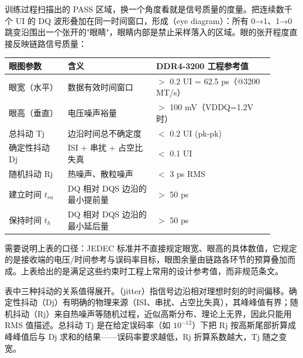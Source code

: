 

训练过程扫描出的 PASS 区域，换一个角度看就是信号质量的度量。把连续数千个 UI 的 DQ 波形叠加在同一时间窗口，形成（eye diagram）：所有 0→1、1→0 跳变沿围出一个张开的"眼睛"，眼睛内部是禁止采样落入的区域。眼的张开程度直接反映链路信号质量：

\begin{longtable}{L{0.2\linewidth}L{0.3\linewidth}L{0.4\linewidth}}
\toprule
眼图参数 & 含义 & DDR4-3200 工程参考值 \\
\midrule
眼宽（水平） & 数据有效时间窗口 & $>$ 0.2 UI = 62.5 ps（@3200 MT/s） \\
眼高（垂直） & 电压噪声裕量 & $>$ 100 mV（VDDQ=1.2V 时） \\
总抖动 Tj & 边沿时间总不确定度 & $<$ 0.2 UI (pk-pk) \\
确定性抖动 Dj & ISI + 串扰 + 占空比失真 & $<$ 0.1 UI \\
随机抖动 Rj & 热噪声、散粒噪声 & $<$ 3 ps RMS \\
建立时间 $t_{su}$ & DQ 相对 DQS 边沿的最小提前量 & $>$ 50 ps \\
保持时间 $t_{h}$ & DQ 相对 DQS 边沿的最小延后量 & $>$ 50 ps \\
\bottomrule
\end{longtable}

需要说明上表的口径：JEDEC 标准并不直接规定眼宽、眼高的具体数值，它规定的是接收端的电压/时间参考与误码率目标，眼图余量由链路各环节的预算叠加而成。上表给出的是满足这些约束时工程上常用的设计参考值，而非规范条文。

表中三种抖动的关系值得展开。（jitter）指信号边沿相对理想时刻的时间偏移。确定性抖动（Dj）有明确的物理来源（ISI、串扰、占空比失真），其峰峰值有界；随机抖动（Rj）来自热噪声等随机过程，近似高斯分布、理论上无界，因此只能用 RMS 值描述。总抖动 Tj 是在给定误码率（如 $10^{-12}$）下把 Rj 按高斯尾部折算成峰峰值后与 Dj 求和的结果——误码率要求越低，Rj 折算系数越大，Tj 随之变宽。



